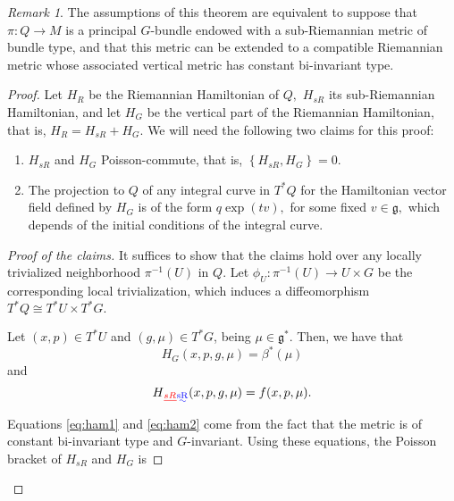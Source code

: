 \documentclass[12pt, letterpaper, reqno]{amsart}
\theoremstyle{definition}
\theoremstyle{plain}
\theoremstyle{remark}
\newtheorem{rem}{Remark}
\providecommand{\DIFadd}[1]{{\protect\color{blue}\uwave{#1}}} %
\providecommand{\DIFdel}[1]{{\protect\color{red}\sout{#1}}}                      %
\providecommand{\DIFaddbegin}{} %
\providecommand{\DIFaddend}{} %
\providecommand{\DIFdelbegin}{} %
\providecommand{\DIFdelend}{} %
\newcommand{\DIFscaledelfig}{0.5}
\newlength{\DIFdelgraphicswidth} %
\newlength{\DIFdelgraphicsheight} %
\newcommand{\DIFaddincludegraphics}[2][]{{\color{blue}\fbox{\DIFOincludegraphics[#1]{#2}}}} %
\newcommand{\DIFdelincludegraphics}[2][]{%
\sbox{\DIFdelgraphicsbox}{\DIFOincludegraphics[#1]{#2}}%
\settoboxwidth{\DIFdelgraphicswidth}{\DIFdelgraphicsbox} %
\settoboxtotalheight{\DIFdelgraphicsheight}{\DIFdelgraphicsbox} %
\scalebox{\DIFscaledelfig}{%
\parbox[b]{\DIFdelgraphicswidth}{\usebox{\DIFdelgraphicsbox}\\[-\baselineskip] \rule{\DIFdelgraphicswidth}{0em}}\llap{\resizebox{\DIFdelgraphicswidth}{\DIFdelgraphicsheight}{%
\setlength{\unitlength}{\DIFdelgraphicswidth}%
\begin{picture}(1,1)%
\thicklines\linethickness{2pt} %
{\color[rgb]{1,0,0}\put(0,0){\framebox(1,1){}}}%
{\color[rgb]{1,0,0}\put(0,0){\line( 1,1){1}}}%
{\color[rgb]{1,0,0}\put(0,1){\line(1,-1){1}}}%
\end{picture}%
}\hspace*{3pt}}} %
} %
\DeclareRobustCommand{\DIFaddbegin}{\DIFOaddbegin \let\includegraphics\DIFaddincludegraphics} %
\DeclareRobustCommand{\DIFaddend}{\DIFOaddend \let\includegraphics\DIFOincludegraphics} %
\DeclareRobustCommand{\DIFdelbegin}{\DIFOdelbegin \let\includegraphics\DIFdelincludegraphics} %
\DeclareRobustCommand{\DIFdelend}{\DIFOaddend \let\includegraphics\DIFOincludegraphics} %
\begin{document}
\begin{rem}
The assumptions of this theorem are equivalent to suppose that $ \pi: Q \rightarrow  M $ is a principal $ G $-bundle endowed with a sub-Riemannian metric of bundle type, and that this metric can be extended to a compatible Riemannian metric whose associated vertical metric has constant bi-invariant type.	
\end{rem}
\begin{proof}
	Let $ H_R $ be the Riemannian Hamiltonian of $ Q, $ \DIFdelbegin \DIFdel{$ H_{sR} $ }\DIFdelend \DIFaddbegin \DIFadd{$ H_{\rm sR} $ }\DIFaddend its sub-Riemannian Hamiltonian, and let $ H_G$ be the vertical part of the Riemannian Hamiltonian, that is, \DIFdelbegin \DIFdel{$ H_R = H_{sR}+H_G. $  }\DIFdelend \DIFaddbegin \DIFadd{$ H_R = H_{\rm sR}+H_G. $  }\DIFaddend We will need the following two claims for this proof:
	\begin{enumerate}
		\item \DIFdelbegin \DIFdel{$ H_{sR} $ }\DIFdelend \DIFaddbegin \DIFadd{$ H_{\rm sR} $ }\DIFaddend and $ H_G $ Poisson-commute, that is, \DIFdelbegin \DIFdel{$ \left\{ H_{sR}, H_G \right\} =0. $ 
		}\DIFdelend \DIFaddbegin \DIFadd{$ \left\{ H_{\rm sR}, H_G \right\} =0. $ 
		}\DIFaddend \item The projection to $ Q $ of any integral curve in $ T^*Q $ for the Hamiltonian vector field defined by $ H_G $ is of the form $ q \operatorname{exp}(tv),  $ for some fixed $ v\in \mathfrak{g}, $ which depends of the initial conditions of the integral curve.
	\end{enumerate}
	\begin{proof}
		[Proof of the claims] It suffices to show that the claims hold over any locally trivialized neighborhood $ \pi^{-1}(U) $ in $ Q. $ Let $ \phi_U: \pi^{-1}(U) \rightarrow U\times G $ be the corresponding local trivialization, which induces a diffeomorphism $ T^*Q \cong T^*U\times T^*G.$

		Let $ (x,p)\in T^* U $ and $ (g,\mu)\in T^*G $, being $ \mu\in \mathfrak{g}^*. $ Then, we have that
		\begin{equation}\label{eq:ham1}
			H_G(x,p,g,\mu) = \beta^*(\mu)
		\end{equation}
		and
		\begin{equation}\label{eq:ham2}
			H\DIFdelbegin \DIFdel{_{sR}}\DIFdelend \DIFaddbegin \DIFadd{_{\rm sR}}\DIFaddend (x,p,g,\mu)= f(x,p,\mu).	
		\end{equation}
		Equations \eqref{eq:ham1} and \eqref{eq:ham2} come from the fact that the metric is of constant bi-invariant type and $ G $-invariant. Using these equations, the Poisson bracket of \DIFdelbegin \DIFdel{$ H_{sR} $ }\DIFdelend \DIFaddbegin \DIFadd{$ H_{\rm sR} $ }\DIFaddend and $ H_{G} $ is


\end{proof}
\end{proof}
\end{document}
